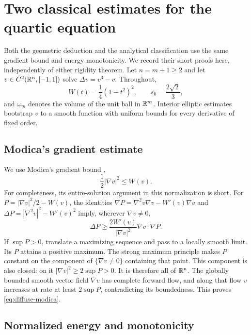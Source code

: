 \section{Two classical estimates for the quartic equation}
\label{sec:classical-estimates}

Both the geometric deduction and the analytical classification use the
same gradient bound and energy monotonicity. We record their short
proofs here, independently of either rigidity theorem. Let $n=m+1\ge2$
and let $v\in C^2(\mathbb R^n,[-1,1])$ solve $\Delta v=v^3-v$.
Throughout,
\[
 W(t)=\frac14(1-t^2)^2,\qquad s_0=\frac{2\sqrt2}{3},
\]
and $\omega_m$ denotes the volume of the unit ball in $\mathbb R^m$.
Interior elliptic estimates bootstrap $v$ to a smooth function with
uniform bounds for every derivative of fixed order.

\subsection{Modica's gradient estimate}

We use Modica's gradient bound \cite{Modica1985},
\begin{equation}\label{eq:diffuse-modica}
 \frac12|\nabla v|^2\le W(v).
\end{equation}
For completeness, its entire-solution argument in this normalization is
short. For $P=|\nabla v|^2/2-W(v)$, the identities
$\nabla P=\nabla^2v\nabla v-W'(v)\nabla v$ and
$\Delta P=|\nabla^2v|^2-W'(v)^2$ imply, wherever $\nabla v\ne0$,
\[
 \Delta P\ge
 \frac{2W'(v)}{|\nabla v|^2}\nabla v\cdot\nabla P.
\]
If $\sup P>0$, translate a maximizing sequence and pass to a locally smooth
limit. Its $P$ attains a positive maximum. The strong maximum principle
makes $P$ constant on the component of $\{\nabla v\ne0\}$ containing that
point. This component is also closed: on it
$|\nabla v|^2\ge2\sup P>0$. It is therefore all of $\mathbb R^n$. The globally
bounded smooth vector field $\nabla v$ has complete forward flow, and along
that flow $v$ increases at rate at least $2\sup P$, contradicting its
boundedness. This proves \eqref{eq:diffuse-modica}.

\subsection{Normalized energy and monotonicity}

